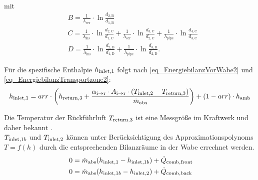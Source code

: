 \vspace*{-\baselineskip}mit
\begin{equation}
\begin{aligned} \label{eq_BestimmungHilfsgrößen}
& B=\frac{1}{\lambda_{\text {cer}}} \cdot \ln \frac{d_{2, \mathrm{B}}}{d_{1, \mathrm{B}}}                                                                                                                                                                              \\
& C=\frac{1}{\lambda_{\text {ins}}} \cdot \ln \frac{d_{2, \mathrm{C}}}{d_{1, \mathrm{C}}}+\frac{1}{\lambda_{\text {cer}}} \cdot \ln \frac{d_{3, \mathrm{C}}}{d_{2, \mathrm{C}}}+\frac{1}{\lambda_{\text {pipe}}} \cdot \ln \frac{d_{4, \mathrm{C}}}{d_{3, \mathrm{C}}} \\
& D=\frac{1}{\lambda_{\text {ins}}} \cdot \ln \frac{d_{2, \mathrm{D}}}{d_{1, \mathrm{D}}}+\frac{1}{\lambda_{\text {pipe}}} \cdot \ln \frac{d_{3, \mathrm{D}}}{d_{2, \mathrm{D}}}.
\end{aligned}
\end{equation}

Für die spezifische Enthalpie $h_{\mathrm{inlet,}1}$ folgt nach \ref{eq_EnergiebilanzVorWabe2} und \ref{eq_EnergiebilanzTransportzone2}:
\begin{equation} \label{eq_Hinlet1}
    h_{\mathrm{inlet,}1} = arr \cdot \left( h_{\mathrm{return,}3} + \frac{\alpha_{\mathrm{i\to r}} \cdot A_{\mathrm{i\to r}} \cdot (T_{\mathrm{inlet,}2} - T_{\mathrm{return,}3})}{\dot{m}_{\mathrm{abs}}}\right) + (1-arr) \cdot h_{\mathrm{amb}}
\end{equation}

Die Temperatur der Rückführluft $T_{\mathrm{return,}3}$ ist eine Messgröße im Kraftwerk und daher bekannt \cite[S.96]{DissGall}.\\
$T_{\mathrm{inlet,}1b}$ und $T_{\mathrm{inlet,}2}$ können unter Berücksichtigung des Approximationspolynoms $T=f(h)$ durch die entsprechenden Bilanzräume in der Wabe errechnet werden.
\begin{align}
    0 & = \MDotAbsorberCup (\SpecificEnthalpyTInlet{1}-\SpecificEnthalpyTInlet{1b}) + \QDotAbsorberCombFront \label{eq_Hinlet1b} \\ \text{\myequations{\quad Algebraische Gleichung zur Bestimmung von $\TInlet{1b}$}}
    0 & = \MDotAbsorberCup (\SpecificEnthalpyTInlet{1b}-\SpecificEnthalpyTInlet{2}) + \QDotAbsorberCombBack \label{eq_Hinlet2}
\end{align}

